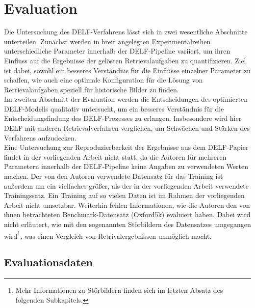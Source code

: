 \chapter{Evaluation}

Die Untersuchung des DELF-Verfahrens lässt sich in zwei wesentliche Abschnitte unterteilen. Zunächst werden in breit angelegten Experimentalreihen unterschiedliche Parameter innerhalb der DELF-Pipeline variiert, um ihren Einfluss auf die Ergebnisse der gelösten Retrievalaufgaben zu quantifizieren. Ziel ist dabei, sowohl ein besseres Verständnis für die Einflüsse einzelner Parameter zu schaffen, wie auch eine optimale Konfiguration für die Lösung von Retrievalaufgaben speziell für historische Bilder zu finden. \\
Im zweiten Abschnitt der Evaluation werden die Entscheidungen des optimierten DELF-Modells qualitativ untersucht, um ein besseres Verständnis für die Entscheidungsfindung des DELF-Prozesses zu erlangen. Insbesondere wird hier DELF mit anderen Retrievalverfahren verglichen, um Schwächen und Stärken des Verfahrens aufzudecken. \\
Eine Untersuchung zur Reproduzierbarkeit der Ergebnisse aus dem DELF-Papier \cite{delf} findet in der vorliegenden Arbeit nicht statt, da die Autoren für mehreren Parametern innerhalb der DELF-Pipeline keine Angaben zu verwendeten Werten machen. Der von den Autoren verwendete Datensatz für das Training ist außerdem um ein vielfaches größer, als der in der vorliegenden Arbeit verwendete Trainingssatz. Ein Training auf so vielen Daten ist im Rahmen der vorliegenden Arbeit nicht umsetzbar. Weiterhin fehlen Informationen, wie die Autoren den von ihnen betrachteten Benchmark-Datensatz (Oxford5k) evaluiert haben. Dabei wird nicht erläutert, wie mit den sogenannten Störbildern des Datensatzes umgegangen wird\footnote{Mehr Informationen zu Störbildern finden sich im letzten Absatz des folgenden Subkapitels.}, was einen Vergleich von Retrivalergebnissen unmöglich macht.
\section{Evaluationsdaten}

